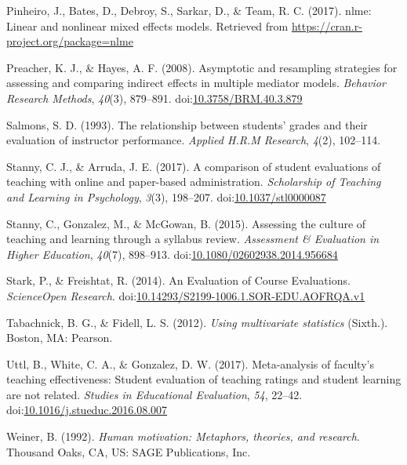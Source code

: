 \documentclass[man]{apa6}
\theoremstyle{definition}
\theoremstyle{definition}
\theoremstyle{definition}
\theoremstyle{remark}
\begin{document}
\hypertarget{ref-Pinheiro2017}{}
Pinheiro, J., Bates, D., Debroy, S., Sarkar, D., \& Team, R. C. (2017).
nlme: Linear and nonlinear mixed effects models. Retrieved from
\url{https://cran.r-project.org/package=nlme}

\hypertarget{ref-Preacher2008}{}
Preacher, K. J., \& Hayes, A. F. (2008). Asymptotic and resampling
strategies for assessing and comparing indirect effects in multiple
mediator models. \emph{Behavior Research Methods}, \emph{40}(3),
879--891.
doi:\href{https://doi.org/10.3758/BRM.40.3.879}{10.3758/BRM.40.3.879}

\hypertarget{ref-Salmons1993}{}
Salmons, S. D. (1993). The relationship between students' grades and
their evaluation of instructor performance. \emph{Applied H.R.M
Research}, \emph{4}(2), 102--114.

\hypertarget{ref-Stanny2017}{}
Stanny, C. J., \& Arruda, J. E. (2017). A comparison of student
evaluations of teaching with online and paper-based administration.
\emph{Scholarship of Teaching and Learning in Psychology}, \emph{3}(3),
198--207.
doi:\href{https://doi.org/10.1037/stl0000087}{10.1037/stl0000087}

\hypertarget{ref-Stanny2015}{}
Stanny, C., Gonzalez, M., \& McGowan, B. (2015). Assessing the culture
of teaching and learning through a syllabus review. \emph{Assessment \&
Evaluation in Higher Education}, \emph{40}(7), 898--913.
doi:\href{https://doi.org/10.1080/02602938.2014.956684}{10.1080/02602938.2014.956684}

\hypertarget{ref-Stark2014}{}
Stark, P., \& Freishtat, R. (2014). An Evaluation of Course Evaluations.
\emph{ScienceOpen Research}.
doi:\href{https://doi.org/10.14293/S2199-1006.1.SOR-EDU.AOFRQA.v1}{10.14293/S2199-1006.1.SOR-EDU.AOFRQA.v1}

\hypertarget{ref-Tabachnick2012}{}
Tabachnick, B. G., \& Fidell, L. S. (2012). \emph{Using multivariate
statistics} (Sixth.). Boston, MA: Pearson.

\hypertarget{ref-Uttl2017}{}
Uttl, B., White, C. A., \& Gonzalez, D. W. (2017). Meta-analysis of
faculty's teaching effectiveness: Student evaluation of teaching ratings
and student learning are not related. \emph{Studies in Educational
Evaluation}, \emph{54}, 22--42.
doi:\href{https://doi.org/10.1016/j.stueduc.2016.08.007}{10.1016/j.stueduc.2016.08.007}

\hypertarget{ref-Weiner1992}{}
Weiner, B. (1992). \emph{Human motivation: Metaphors, theories, and
research}. Thousand Oaks, CA, US: SAGE Publications, Inc.
\end{document}

